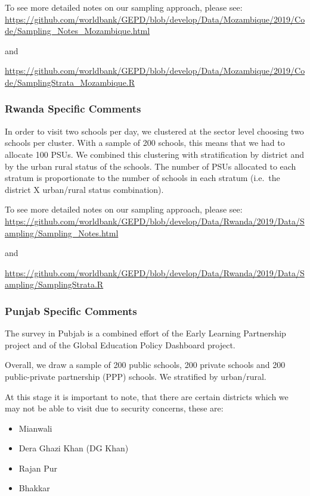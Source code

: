 \documentclass[]{article}
\providecommand{\tightlist}{%
  \setlength{\itemsep}{0pt}\setlength{\parskip}{0pt}}
\begin{document}
To see more detailed notes on our sampling approach, please see:
\url{https://github.com/worldbank/GEPD/blob/develop/Data/Mozambique/2019/Code/Sampling_Notes_Mozambique.html}

and

\url{https://github.com/worldbank/GEPD/blob/develop/Data/Mozambique/2019/Code/SamplingStrata_Mozambique.R}

\hypertarget{rwanda-specific-comments}{%
\subsubsection{Rwanda Specific
Comments}\label{rwanda-specific-comments}}

In order to visit two schools per day, we clustered at the sector level
choosing two schools per cluster. With a sample of 200 schools, this
means that we had to allocate 100 PSUs. We combined this clustering with
stratification by district and by the urban rural status of the schools.
The number of PSUs allocated to each stratum is proportionate to the
number of schools in each stratum (i.e.~the district X urban/rural
status combination).

To see more detailed notes on our sampling approach, please see:
\url{https://github.com/worldbank/GEPD/blob/develop/Data/Rwanda/2019/Data/Sampling/Sampling_Notes.html}

and

\url{https://github.com/worldbank/GEPD/blob/develop/Data/Rwanda/2019/Data/Sampling/SamplingStrata.R}

\hypertarget{punjab-specific-comments}{%
\subsubsection{Punjab Specific
Comments}\label{punjab-specific-comments}}

The survey in Pubjab is a combined effort of the Early Learning
Partnership project and of the Global Education Policy Dashboard
project.

Overall, we draw a sample of 200 public schools, 200 private schools and
200 public-private partnership (PPP) schools. We stratified by
urban/rural.

At this stage it is important to note, that there are certain districts
which we may not be able to visit due to security concerns, these are:

\begin{itemize}
\tightlist
\item
  Mianwali
\item
  Dera Ghazi Khan (DG Khan)
\item
  Rajan Pur
\item
  Bhakkar
\end{itemize}
\end{document}
